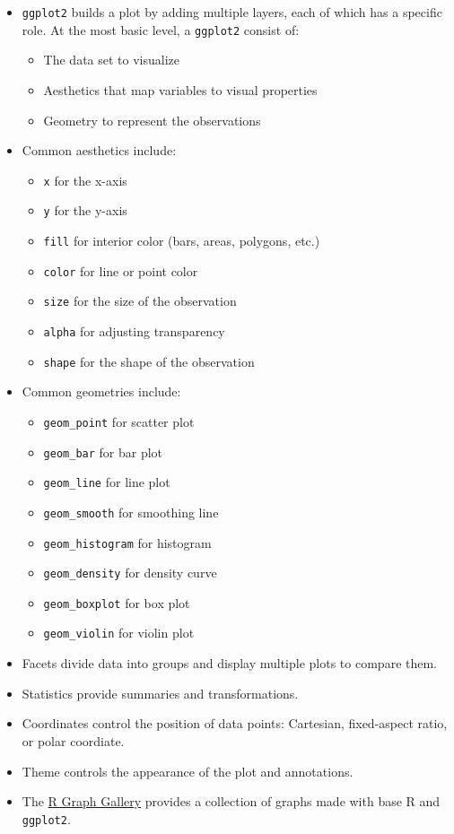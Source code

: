 \documentclass[
  letterpaper,
  DIV=11,
  numbers=noendperiod]{scrreprt}
\providecommand{\tightlist}{%
  \setlength{\itemsep}{0pt}\setlength{\parskip}{0pt}}\usepackage{longtable,booktabs,array}
\begin{document}
\begin{itemize}
\item
  \texttt{ggplot2} builds a plot by adding multiple layers, each of
  which has a specific role. At the most basic level, a \texttt{ggplot2}
  consist of:

  \begin{itemize}
  \tightlist
  \item
    The data set to visualize
  \item
    Aesthetics that map variables to visual properties
  \item
    Geometry to represent the observations
  \end{itemize}
\item
  Common aesthetics include:

  \begin{itemize}
  \tightlist
  \item
    \texttt{x} for the x-axis
  \item
    \texttt{y} for the y-axis
  \item
    \texttt{fill} for interior color (bars, areas, polygons, etc.)
  \item
    \texttt{color} for line or point color
  \item
    \texttt{size} for the size of the observation
  \item
    \texttt{alpha} for adjusting transparency
  \item
    \texttt{shape} for the shape of the observation
  \end{itemize}
\item
  Common geometries include:

  \begin{itemize}
  \tightlist
  \item
    \texttt{geom\_point} for scatter plot
  \item
    \texttt{geom\_bar} for bar plot
  \item
    \texttt{geom\_line} for line plot
  \item
    \texttt{geom\_smooth} for smoothing line
  \item
    \texttt{geom\_histogram} for histogram
  \item
    \texttt{geom\_density} for density curve
  \item
    \texttt{geom\_boxplot} for box plot
  \item
    \texttt{geom\_violin} for violin plot
  \end{itemize}
\item
  Facets divide data into groups and display multiple plots to compare
  them.
\item
  Statistics provide summaries and transformations.
\item
  Coordinates control the position of data points: Cartesian,
  fixed-aspect ratio, or polar coordiate.
\item
  Theme controls the appearance of the plot and annotations.
\item
  The \href{https://r-graph-gallery.com/}{R Graph Gallery} provides a
  collection of graphs made with base R and \texttt{ggplot2}.
\end{itemize}
\end{document}
